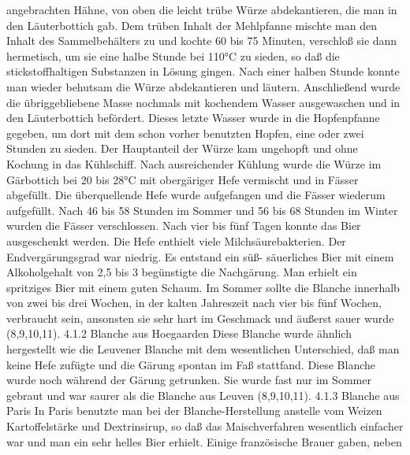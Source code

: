 \documentclass[a4paper,parskip=half]{scrartcl}
\begin{document}
angebrachten Hähne, von oben die leicht trübe Würze abdekantieren, die man in den
Läuterbottich gab.
Dem trüben Inhalt der Mehlpfanne mischte man den Inhalt des Sammelbehälters zu
und kochte 60 bis 75 Minuten, verschloß sie dann hermetisch, um sie eine halbe
Stunde bei 110°C zu sieden, so daß die stickstoffhaltigen Substanzen in Lösung
gingen.
Nach einer halben Stunde konnte man wieder behutsam die Würze abdekantieren
und läutern. Anschließend wurde die übriggebliebene Masse nochmals mit
kochendem Wasser ausgewaschen und in den Läuterbottich befördert. Dieses letzte
Wasser wurde in die Hopfenpfanne gegeben, um dort mit dem schon vorher
benutzten Hopfen, eine oder zwei Stunden zu sieden. Der Hauptanteil der Würze
kam ungehopft und ohne Kochung in das Kühlschiff.
Nach ausreichender Kühlung wurde die Würze im Gärbottich bei 20 bis 28°C mit
obergäriger Hefe vermischt und in Fässer abgefüllt. Die überquellende Hefe wurde
aufgefangen und die Fässer wiederum aufgefüllt. Nach 46 bis 58 Stunden im
Sommer und 56 bis 68 Stunden im Winter wurden die Fässer verschlossen. Nach
vier bis fünf Tagen konnte das Bier ausgeschenkt werden. Die Hefe enthielt viele
Milchsäurebakterien. Der Endvergärungsgrad war niedrig. Es entstand ein süß-
säuerliches Bier mit einem Alkoholgehalt von 2,5 bis 3 %
begünstigte die Nachgärung. Man erhielt ein spritziges Bier mit einem guten Schaum.
Im Sommer sollte die Blanche innerhalb von zwei bis drei Wochen, in der kalten
Jahreszeit nach vier bis fünf Wochen, verbraucht sein, ansonsten sie sehr hart im
Geschmack und äußerst sauer wurde (8,9,10,11).
4.1.2 Blanche aus Hoegaarden
Diese Blanche wurde ähnlich hergestellt wie die Leuvener Blanche mit dem
wesentlichen Unterschied, daß man keine Hefe zufügte und die Gärung spontan im
Faß stattfand. Diese Blanche wurde noch während der Gärung getrunken. Sie wurde
fast nur im Sommer gebraut und war saurer als die Blanche aus Leuven (8,9,10,11).
4.1.3 Blanche aus Paris
In Paris benutzte man bei der Blanche-Herstellung anstelle vom Weizen
Kartoffelstärke und Dextrinsirup, so daß das Maischverfahren wesentlich einfacher
war und man ein sehr helles Bier erhielt. Einige französische Brauer gaben, neben

\parencite[12]{Strottner1999}
\end{document}
